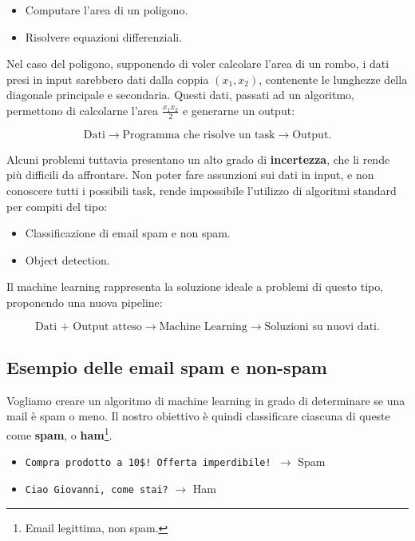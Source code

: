 \begin{itemize}
    \item Computare l'area di un poligono.
    \item Risolvere equazioni differenziali.
\end{itemize}

Nel caso del poligono, supponendo di voler calcolare l'area di un rombo, i dati presi in input sarebbero dati dalla coppia $(x_1, x_2)$, contenente le lunghezze della diagonale principale e secondaria. Questi dati, passati ad un algoritmo, permettono di calcolarne l'area $\frac{x_1 x_2}{2}$ e generarne un output:

$$
\text{Dati} \to \text{Programma che risolve un task} \to \text{Output}.
$$

Alcuni problemi tuttavia presentano un alto grado di \textbf{incertezza}, che li rende pi\`u difficili da affrontare. Non poter fare assunzioni sui dati in input, e non conoscere tutti i possibili task, rende impossibile l'utilizzo di algoritmi standard per compiti del tipo:

\begin{itemize}
\item Classificazione di email spam e non spam.
\item Object detection.
\end{itemize}

Il machine learning rappresenta la soluzione ideale a problemi di questo tipo, proponendo una nuova pipeline:

$$
\text{Dati + Output atteso} \to \text{Machine Learning} \to \text{Soluzioni su nuovi dati}.
$$

\subsection{Esempio delle email spam e non-spam}

Vogliamo creare un algoritmo di machine learning in grado di determinare se una mail \`e spam o meno. Il nostro obiettivo \`e quindi classificare ciascuna di queste come \textbf{spam}, o \textbf{ham}\footnote{Email legittima, non spam.}.

\begin{itemize}
    \item \verb|Compra prodotto a 10$! Offerta imperdibile! |$\rightarrow$ Spam
    \item \verb|Ciao Giovanni, come stai?| $\rightarrow$ Ham
\end{itemize}

